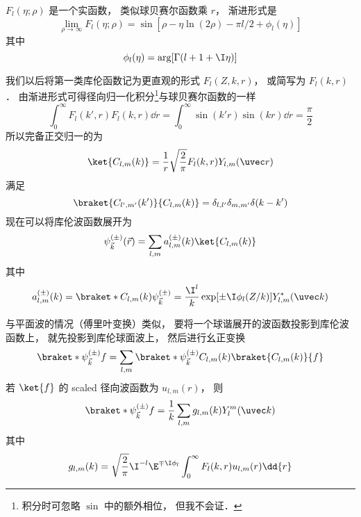 $F_l(\eta; \rho)$ 是一个实函数， 类似球贝赛尔函数乘 $r$， 渐进形式是
\begin{equation}
\lim_{\rho\to \infty} F_l(\eta; \rho) = \sin[\rho - \eta\ln(2\rho) - \pi l/2 + \phi_l(\eta)]
\end{equation}
其中
\begin{equation}
\phi_l(\eta) = \arg[\Gamma(l+1+\I\eta)]
\end{equation}

我们以后将第一类库伦函数记为更直观的形式 $F_l(Z, k, r)$， 或简写为 $F_l(k, r)$． 由渐进形式可得径向归一化积分\footnote{积分时可忽略 $\sin$ 中的额外相位， 但我不会证．}与球贝赛尔函数的一样
\begin{equation}
\int_0^\infty F_l(k', r)F_l(k, r) \dd{r} = \int_0^\infty \sin(k'r)\sin(kr) \dd{r} = \frac{\pi}{2}
\end{equation}
所以完备正交归一的为
\begin{equation}
\ket{C_{l,m}(k)} = \frac{1}{r} \sqrt{\frac{2}{\pi}} F_l(k,r) Y_{l,m}(\uvec r)
\end{equation}
满足
\begin{equation}
\braket{C_{l',m'}(k')}{C_{l,m}(k)} = \delta_{l,l'}\delta_{m,m'}\delta(k-k')
\end{equation}
现在可以将库伦波函数展开为
\begin{equation}
\psi_{\vec k}^{(\pm)}(\vec r) =  \sum_{l,m} a_{l,m}^{(\pm)}(k) \ket{C_{l,m}(k)}
\end{equation}
其中
\begin{equation}%
a_{l,m}^{(\pm)}(k) =  \braket*{C_{l,m}(k)}{\psi_{\vec k}^{(\pm)}} = \frac{\I^l}{k} \exp[\pm\I\phi_l(Z/k)] Y_{l,m}^* (\uvec k)
\end{equation}

与平面波的情况（傅里叶变换）类似， 要将一个球谐展开的波函数投影到库伦波函数上， 就先投影到库伦球面波上， 然后进行幺正变换
\begin{equation}
\braket*{\psi_{\vec k}^{(\pm)}}{f} = \sum_{l,m} \braket*{\psi_{\vec k}^{(\pm)}}{C_{l,m}(k)} \braket{C_{l,m}(k)}{f}
\end{equation}
若 $\ket{f}$ 的 scaled 径向波函数为 $u_{l,m}(r)$， 则
\begin{equation}
\braket*{\psi_{\vec k}^{(\pm)}}{f} = \frac{1}{k} \sum_{l,m} g_{l,m}(k) Y_l^m(\uvec k)
\end{equation}
其中
\begin{equation}
g_{l,m}(k) = \sqrt{\frac{2}{\pi}} \I^{-l} \E^{\mp\I\phi_l} \int_0^\infty F_l(k,r) u_{l,m}(r) \dd{r}
\end{equation}


